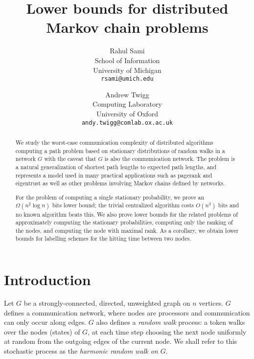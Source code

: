 \documentclass[twocolumn]{article}
\begin{document}
\title{Lower bounds for distributed \\ Markov chain problems}
\author{Rahul Sami \\ School of Information \\ University of Michigan
  \\ \texttt{rsami@umich.edu} \and Andrew Twigg \\ Computing Laboratory
  \\ University of Oxford \\ \texttt{andy.twigg@comlab.ox.ac.uk}
}
\maketitle

\begin{abstract}
We study the worst-case communication complexity of distributed algorithms computing a path problem based on stationary distributions of random walks in a network $G$ with the caveat that $G$ is also the communication network. The problem is a natural generalization of shortest path lengths to expected path lengths, and represents a model used in many practical applications such as pagerank and eigentrust as well as other problems involving Markov chains defined by networks.

For the problem of computing a single stationary probability, we prove an $\Omega(n^2 \log n)$ bits lower bound; the trivial centralized algorithm
costs $O(n^3)$ bits and no known algorithm beats this. We also prove lower bounds for the related problems of approximately computing the stationary probabilities, computing only the ranking of the nodes, and computing the node with maximal rank. As a corollary, we obtain lower bounds for labelling schemes for the hitting time between two nodes.
\end{abstract}

\section{Introduction}
\label{section:introduction}

Let $G$ be a strongly-connected, directed, unweighted graph on $n$ vertices. $G$ defines a communication network, where nodes are processors and communication can only occur along edges. $G$ also defines a {\em random walk} process: a token walks over the nodes (states) of $G$, at each time step choosing the next node uniformly at random from the outgoing edges of the current node. We shall refer to this stochastic process as the {\em harmonic random walk on $G$}.
\end{document}
